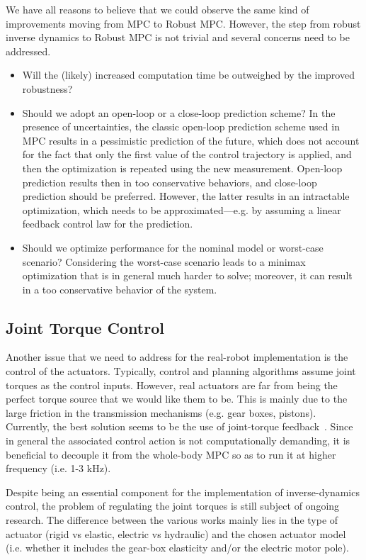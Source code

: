 We have all reasons to believe that we could observe the same kind of improvements moving from MPC to Robust MPC.
However, the step from robust inverse dynamics to Robust MPC is not trivial and several concerns need to be addressed.
\begin{itemize}
\item Will the (likely) increased computation time be outweighed by the improved robustness?
\item Should we adopt an open-loop or a close-loop prediction scheme? In the presence of uncertainties, the classic open-loop prediction scheme used in MPC results in a pessimistic prediction of the future, which does not account for the fact that only the first value of the control trajectory is applied, and then the optimization is repeated using the new measurement. Open-loop prediction results then in too conservative behaviors, and close-loop prediction should be preferred. However, the latter results in an intractable optimization, which needs to be approximated---e.g. by assuming a linear feedback control law for the prediction.
\item Should we optimize performance for the nominal model or worst-case scenario? Considering the worst-case scenario leads to a minimax optimization that is in general much harder to solve; moreover, it can result in a too conservative behavior of the system.
\end{itemize}


\subsection{Joint Torque Control}
Another issue that we need to address for the real-robot implementation is the control of the actuators.
Typically, control and planning algorithms assume joint torques as the control inputs.
However, real actuators are far from being the perfect torque source that we would like them to be.
This is mainly due to the large friction in the transmission mechanisms (e.g. gear boxes, pistons).
Currently, the best solution seems to be the use of joint-torque feedback~\citep{Albu-Schaffer2007, Boaventura2012b}.
Since in general the associated control action is not computationally demanding, it is beneficial to decouple it from the whole-body MPC so as to run it at higher frequency (i.e. 1-3 kHz).

Despite being an essential component for the implementation of inverse-dynamics control, the problem of regulating the joint torques is still subject of ongoing research. The difference between the various works mainly lies in the type of actuator (rigid vs elastic, electric vs hydraulic) and the chosen actuator model (i.e. whether it includes the gear-box elasticity and/or the electric motor pole).

